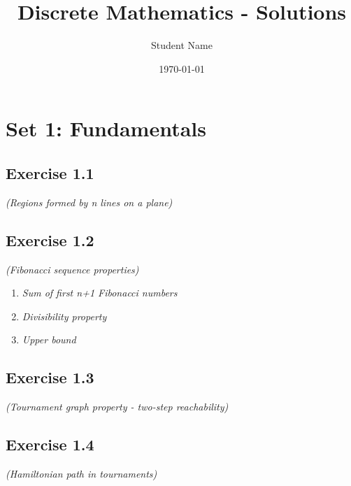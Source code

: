 \documentclass[12pt,a4paper]{article}
\title{Discrete Mathematics - Solutions}
\author{Student Name}
\date{\today}
\begin{document}
\maketitle

\section{Set 1: Fundamentals}

\subsection*{Exercise 1.1}
\textit{(Regions formed by n lines on a plane)}

\vspace{1cm}

\subsection*{Exercise 1.2}
\textit{(Fibonacci sequence properties)}

\begin{enumerate}[label=(\roman*)]
\item \textit{Sum of first n+1 Fibonacci numbers}
\vspace{1cm}

\item \textit{Divisibility property}
\vspace{1cm}

\item \textit{Upper bound}
\vspace{1cm}
\end{enumerate}

\subsection*{Exercise 1.3}
\textit{(Tournament graph property - two-step reachability)}

\vspace{1cm}

\subsection*{Exercise 1.4}
\textit{(Hamiltonian path in tournaments)}

\vspace{1cm}
\end{document}
